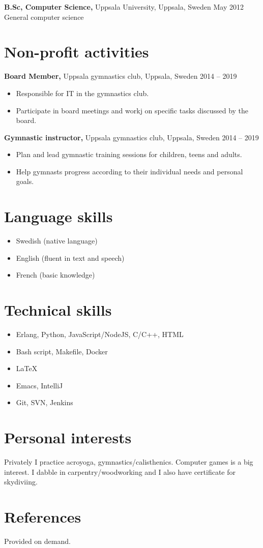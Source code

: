 \documentclass[margin]{res}
\begin{document}
\begin{resume}
{\bf B.Sc, Computer Science,} Uppsala University, Uppsala, Sweden \hfill May 2012 \\
General computer science

\newpage
\section{Non-profit activities}

{\bf Board Member,} Uppsala gymnastics club, Uppsala, Sweden \hfill 2014 -- 2019
\begin{itemize} \itemsep -2pt
\item Responsible for IT in the gymnastics club.
\item Participate in board meetings and workj on specific tasks discussed by the board.
\end{itemize}

{\bf Gymnastic instructor,} Uppsala gymnastics club, Uppsala, Sweden \hfill 2014 -- 2019
\begin{itemize} \itemsep -2pt
\item Plan and lead gymnastic training sessions for children, teens and adults.
\item Help gymnasts progress according to their individual needs and personal goals.
\end{itemize}

\section{Language skills}
\begin{itemize} \itemsep -2pt
\item Swedish (native language)
\item English (fluent in text and speech)
\item French (basic knowledge)
\end{itemize}

\section{Technical skills}
\begin{itemize} \itemsep -2pt
\item Erlang, Python, JavaScript/NodeJS, C/C++, HTML
\item Bash script, Makefile, Docker
\item LaTeX
\item Emacs, IntelliJ
\item Git, SVN, Jenkins
\end{itemize}

\section{Personal interests}
Privately I practice acroyoga, gymnastics/calisthenics. Computer games is a big interest. I dabble
in carpentry/woodworking and I also have certificate for skydiviing.

\section{References}
Provided on demand.

\end{resume}
\end{document}
